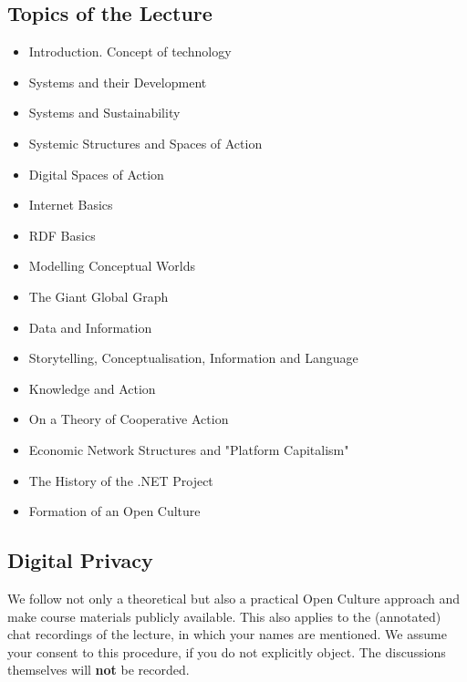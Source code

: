 \documentclass[11pt,a4paper]{article}
\begin{document}
\subsection{Topics of the Lecture}

\begin{itemize}
\item Introduction. Concept of technology
\item Systems and their Development
\item Systems and Sustainability
\item Systemic Structures and Spaces of Action
\item Digital Spaces of Action
\item Internet Basics
\item RDF Basics
\item Modelling Conceptual Worlds
\item The Giant Global Graph
\item Data and Information
\item Storytelling, Conceptualisation, Information and Language
\item Knowledge and Action
\item On a Theory of Cooperative Action
\item Economic Network Structures and "Platform Capitalism"
\item The History of the .NET Project
\item Formation of an Open Culture
\end{itemize}

\subsection{Digital Privacy}

We follow not only a theoretical but also a practical Open Culture approach
and make course materials publicly available.  This also applies to the
(annotated) chat recordings of the lecture, in which your names are mentioned.
We assume your consent to this procedure, if you do not explicitly object.
The discussions themselves will \textbf{not} be recorded.
\end{document}
